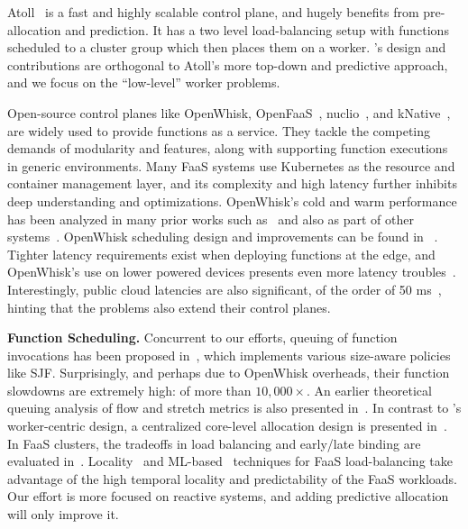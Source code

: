 Atoll~\cite{singhvi2021atoll} is a fast and highly scalable control plane, and hugely benefits from pre-allocation and prediction.
It has a two level load-balancing setup with functions scheduled to a cluster group which then places them on a worker. 
\sysname's design and contributions are orthogonal to Atoll's more top-down and predictive approach, and we focus on the ``low-level'' worker problems.


Open-source control planes like OpenWhisk, OpenFaaS~\cite{openfaas}, nuclio~\cite{nuclio}, and kNative~\cite{knative}, are widely used to provide functions as a service. 
They tackle the competing demands of modularity and features, along with supporting function executions in generic environments.
Many FaaS systems use Kubernetes as the resource and container management layer, and its complexity and high latency further inhibits deep understanding and optimizations. 
OpenWhisk's cold and warm performance has been analyzed in many prior works such as~\cite{quevedo_evaluating_2019} and also as part of other systems~\cite{scheuner_lets_2022, alzayat_groundhog_2022, faaslb-hpdc22, faascache-asplos21}. 
OpenWhisk scheduling design and improvements can be found in ~\cite{kim_scheduling_2021, faaslb-hpdc22}.
Tighter latency requirements exist when deploying functions at the edge, and OpenWhisk's use on lower powered devices presents even more latency troubles~\cite{palade-edge-22, pfandzelter_tinyfaas_2020, hall_execution_2019, wang2021lass}. 
Interestingly, public cloud latencies are also significant, of the order of 50 ms~\cite{ustiugov_analyzing_2021}, hinting that the problems also extend their control planes. 


\noindent \textbf{Function Scheduling.}
Concurrent to our efforts, queuing of function invocations has been proposed in~\cite{zuk_call_2022}, which implements various size-aware policies like SJF. 
Surprisingly, and perhaps due to OpenWhisk overheads, their function slowdowns are extremely high: of more than $10,000\times$. 
An earlier theoretical queuing analysis of flow and stretch metrics is also presented in~\cite{zuk_scheduling_2020}. 
In contrast to \sysname's worker-centric design, a centralized core-level allocation design is presented in~\cite{kaffes_centralized_2019}.
In FaaS clusters, the tradeoffs in load balancing and early/late binding are evaluated in~\cite{kaffes_hermod_2022}.
Locality~\cite{faaslb-hpdc22}  and ML-based~\cite{yu2021faasrank} techniques for FaaS load-balancing take advantage of the high temporal locality and predictability of the FaaS workloads.
Our effort is more focused on reactive systems, and adding predictive allocation will only improve it. 

